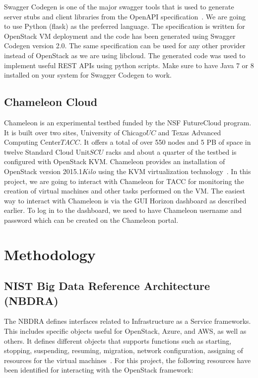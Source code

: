 Swagger Codegen is one of the major swagger tools that is used to generate
server stubs and client libraries from the OpenAPI
specification~\cite{hid-sp18-516-www-swagger}. We are going to use Python
(flask) as the preferred language. The specification is written for OpenStack 
VM deployment and the code has been generated using Swagger Codegen version 
2.0. The same specification can be used for any other provider instead of 
OpenStack as we are using libcloud. The generated code was used to implement 
useful REST APIs using python scripts. Make sure to have Java 7 or 8 installed 
on your system for Swagger Codegen to work. 

\subsection{Chameleon Cloud}
Chameleon is an experimental testbed funded by the NSF FutureCloud program. It
is built over two sites, University of Chicago\(UC\) and Texas Advanced
Computing Center\(TACC\). It offers a total of over 550 nodes and 5 PB of space
in twelve Standard Cloud Unit\(SCU\) racks and about a quarter of the testbed 
is configured with OpenStack KVM. Chameleon provides an installation of 
OpenStack version 2015.1\(Kilo\) using the KVM virtualization
technology~\cite{hid-sp18-516-las-handbook}. In this project, we are going to
interact with Chameleon for TACC for monitoring the creation of virtual 
machines and other tasks performed on the VM. The easiest way to interact 
with Chameleon is via the GUI Horizon dashboard as described earlier. To log 
in to the dashboard, we need to have Chameleon username and password which can 
be created on the Chameleon portal. 

\section{Methodology}

\subsection{NIST Big Data Reference Architecture (NBDRA)}
The NBDRA defines interfaces related to Infrastructure as a Service frameworks.
This includes specific objects useful for OpenStack, Azure, and AWS, as well as
others. It defines different objects that supports functions such as starting,
stopping, suspending, resuming, migration, network configuration, assigning of
resources for the virtual machines~\cite{hid-sp18-516-nist-vol8}. For this
project, the following resources have been identified for interacting with the
OpenStack framework:

